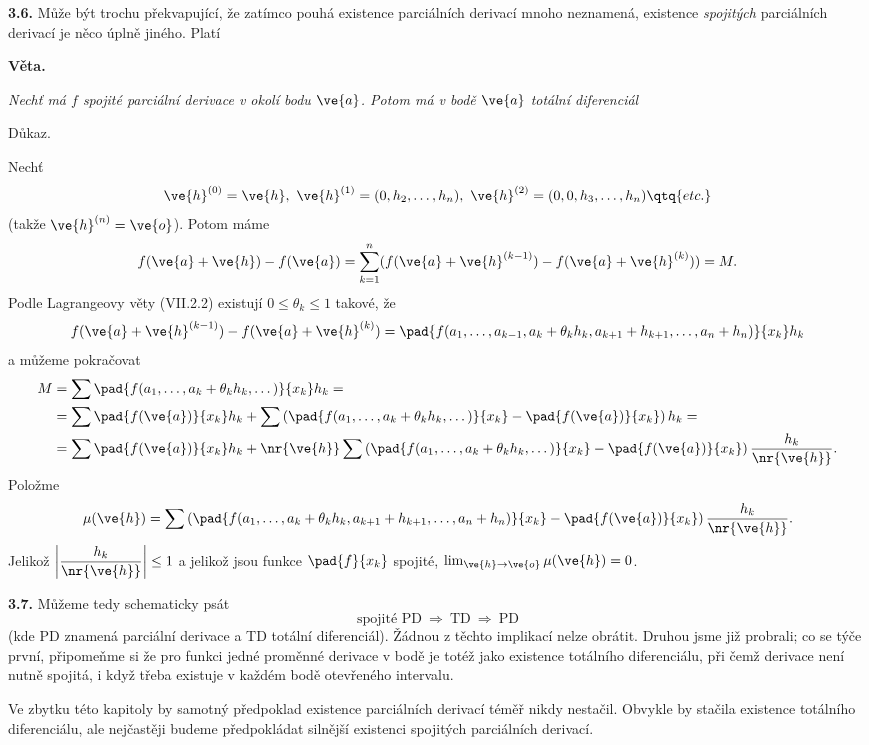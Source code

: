 \documentclass[12pt]{article}
\begin{document}
{{\bf 3.6.} Může být trochu překvapující, že zatímco pouhá existence parciálních derivací mnoho neznamená,
existence
 {\em spojitých} parciálních derivací je něco úplně jiného. Platí

\bigskip

{\bf Věta.} {\em Nechť má $f$ spojité parciální derivace v okolí bodu $\ve{a}$. Potom má v bodě $\ve{a}$ totální diferenciál

Důkaz.} Nechť
$$
\ve{h}^{(0)}=\ve{h},\ \ve{h}^{(1)}=(0,h_2,\dots,h_n),\
\ve{h}^{(2)}=(0,0,h_3,\dots,h_n)\qtq{etc.}
$$
(takže $\ve{h}^{(n)}=\ve{o}$). Potom máme
$$
f(\ve{a}+\ve{h})-f(\ve{a})=\sum_{k=1}^n(f(\ve{a}+\ve{h}^{(k-1)})-f(\ve{a}+\ve{h}^{(k)}))=M.
$$
Podle Lagrangeovy věty (VII.2.2) existují $0\leq\theta_k\leq 1$ takové, že
$$
f(\ve{a}+\ve{h}^{(k-1)})-f(\ve{a}+\ve{h}^{(k)})=\pad{f(a_1,\dots,a_{k-1},a_k+\theta_kh_k,a_{k+1}+h_{k+1},\dots,a_n+h_n)}{x_k}h_k
$$
a můžeme pokračovat
$$
\begin{aligned}
M&=\sum\pad{f(a_1,\dots,a_k+\theta_kh_k,\dots)}{x_k}h_k=\\
   &=\sum\pad{f(\ve{a})}{x_k}h_k +\sum\left(\pad{f(a_1,\dots,a_k+\theta_kh_k,\dots)}{x_k}-\pad{f(\ve{a})}{x_k}\right)h_k=\\
   &=\sum\pad{f(\ve{a})}{x_k}h_k+\nr{\ve{h}}\sum\left(\pad{f(a_1,\dots,a_k   +\theta_kh_k,\dots)}{x_k}-\pad{f(\ve{a})}{x_k}\right)\frac{h_k}{\nr{\ve{h}}}.
   \end{aligned}
   $$
Položme
$$
\mu(\ve{h})=\sum\left(\pad{f(a_1,\dots,a_k+\theta_kh_k,a_{k+1}+h_{k+1},\dots,a_n+h_n)}{x_k}-\pad{f(\ve{a})}{x_k}\right)\frac{h_k}{\nr{\ve{h}}}.
$$
Jelikož $\displaystyle{\left|\frac{h_k}{\nr{\ve{h}}}\right|}\leq 1$ a jelikož jsou funkce $\pad{f}{x_k}$ spojité, $\lim_{\ve{h}\to\ve{o}}\mu(\ve{h})=0$. \sq   

\bigskip

{\bf 3.7.} Můžeme tedy schematicky psát
$$
\text{spojité PD}\ \Rightarrow\ \text{TD}\ \Rightarrow\ \text{PD}
$$
(kde PD znamená parciální derivace a TD totální diferenciál). 
Žádnou z těchto implikací nelze obrátit. 
Druhou jsme již probrali; 
co se týče první, připomeňme si že pro funkci jedné proměnné derivace v bodě
je totéž jako existence totálního diferenciálu, při čemž derivace
není nutně spojitá, i když třeba existuje v každém bodě otevřeného intervalu.

\smallskip

Ve zbytku této kapitoly by samotný předpoklad existence parciálních derivací téměř nikdy nestačil.
Obvykle by stačila existence totálního diferenciálu, ale nejčastěji budeme předpokládat silnější
existenci spojitých parciálních derivací.




}
\end{document}
